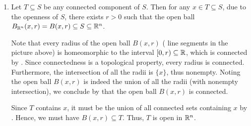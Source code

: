 \begin{enumerate}
\begin{pf}
\begin{enumerate}
\item Let \(T\subseteq S\) be any connected component of \(S\). Then for any
\(x\in T\subseteq S\), due to the openness of \(S\), there exists \(r>0\) such
that the open ball \(B_{\mathbb{R}^n}(x,r)=B(x,r)\subseteq S\subseteq \mathbb{R}^n\).
\begin{center}
\end{center}
Note that every radius of the open ball \(B(x,r)\) ( line segments in
the picture above) is homeomorphic to the interval \([0,r)\subseteq \mathbb{R}\), which
is connected by . Since connectedness is a topological
property, every radius is connected. Furthermore, the intersection of all the
radii is \(\{x\}\), thus nonempty. Noting the open ball \(B(x,r)\) is indeed
the union of all the radii (with nonempty intersection), we conclude by
 that the open ball \(B(x,r)\) is
connected.

Since \(T\) contains \(x\), it must be the union of all connected sets
containing \(x\) by .  Hence, we must have
\(B(x,r)\subseteq T\). Thus, \(T\) is open in \(\mathbb{R}^n\).
\end{enumerate}
\end{pf}
\end{enumerate}
